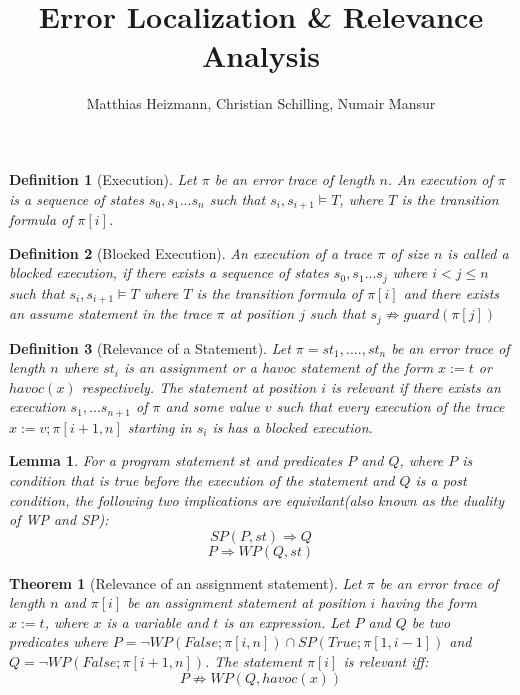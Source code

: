 \documentclass{article}
\title{Error Localization \& Relevance Analysis \\ }
\author{Matthias Heizmann, Christian Schilling, Numair Mansur}
\affil{University of Freiburg, Germany}
\date{\vspace{-5ex}}
\newcommand{\limp}{\Rightarrow}
\newtheorem{mydef}{Definition}
\newtheorem{theorem}{Theorem}
\newtheorem{lemma}{Lemma}
\begin{document}
\begin{mydef}[Execution]\label{mydef:execution}
Let $\pi$ be an error trace of length $n$. An execution of $\pi$ is a sequence of states $s_0, s_1 ... s_n$ such that $s_i, s_{i+1} \vDash T$, where $T$ is the transition formula of $\pi[i]$.
\end{mydef}
\begin{mydef}[Blocked Execution]\label{mydef:blocked_execution}
An execution of a trace $\pi$ of size $n$ is called a blocked execution, if there exists a sequence of states $s_0,s_1...s_j$ where $i<j \leq n$ such that $s_i, s_{i+1} \vDash T$ where $T$ is the transition formula of $\pi[i]$ and there exists an assume statement in the trace $\pi$ at position $j$ such that $s_j \not \limp guard(\pi[j])$
\end{mydef}

\begin{mydef}[Relevance of a Statement]\label{mydef:responsible}
Let $\pi = st_1,....,st_n$ be an error trace of length $n$ where $st_i$ is an assignment or a havoc statement of the form $x:=t$ or $havoc(x)$ respectively. The statement at position $i$ is relevant if there exists an execution $s_1,...s_{n+1}$ of $\pi$ and some value $v$ such that every execution of the trace $x:=v; \pi[i+1,n]$ starting in $s_i$ is has a blocked execution.
\end{mydef}

\begin{lemma}\label{lemma:duality}
For a program statement $st$ and predicates $P$ and $Q$, where $P$ is condition that is true before the execution of the statement and $Q$ is a post condition, the following two implications are equivilant(also known as the duality of WP and SP):
$$SP(P,st) \Rightarrow Q$$
$$P \Rightarrow WP(Q,st)$$
\end{lemma}

\newpage
\begin{theorem}[Relevance of an assignment statement]\label{mydef:relevancytheorem}
Let $\pi$ be an error trace of length $n$ and $\pi[i]$ be an assignment statement at position $i$ having the form $x:=t$, where $x$ is a variable and $t$ is an expression. Let $P$ and $Q$ be two predicates where $P = \neg WP(False; \pi[i,n]) \cap SP(True; \pi[1,i-1])$ and $Q =  \neg WP(False; \pi[i+1,n])$. The statement $\pi[i]$ is relevant iff:
 $$P \not \limp WP(Q,havoc(x))$$
\end{theorem}
\end{document}
